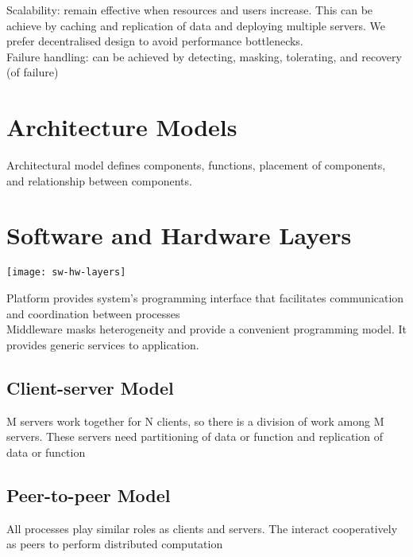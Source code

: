 \begin{multicols*}{2}
\noindent Scalability: remain effective when resources and users increase. This can be achieve by caching and replication of data and deploying multiple servers. We prefer decentralised design to avoid performance bottlenecks. \\

\noindent Failure handling: can be achieved by detecting, masking, tolerating, and recovery (of failure)\\

\section{Architecture Models}

\noindent Architectural model defines components, functions, placement of components, and relationship between components.

\section{Software and Hardware Layers}

\begin{center}
\texttt{[image: sw-hw-layers]}
\end{center}

\noindent Platform provides system’s programming interface that facilitates communication and coordination between processes\\ 

\noindent Middleware masks heterogeneity and provide a convenient programming model. It provides generic services to application. \\ 

\subsection{Client-server Model}

\noindent M servers work together for N clients, so there is a division of work among M servers. These servers need partitioning of data or function and replication of data or function

\subsection{Peer-to-peer Model}

\noindent All processes play similar roles as clients and servers. The interact cooperatively as peers to perform distributed computation 


\end{multicols*}
